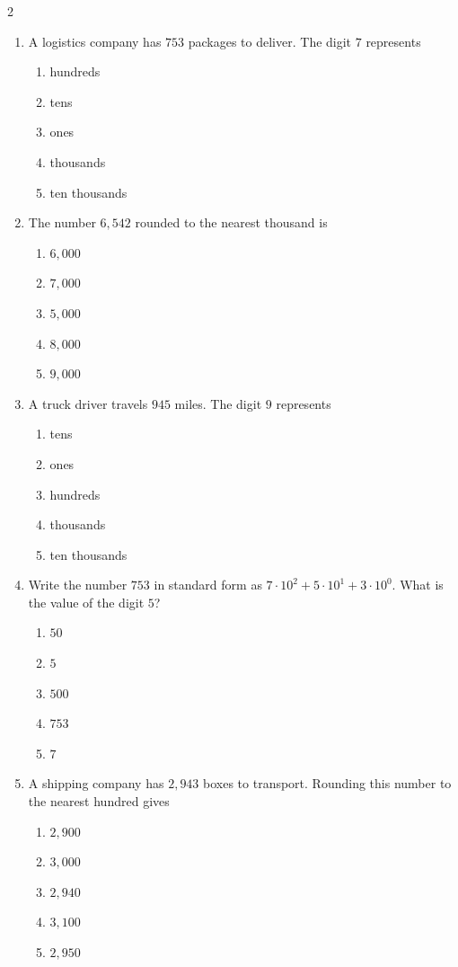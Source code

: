 \documentclass[10pt]{article}
\begin{document}
\begin{multicols}{2}
\begin{enumerate}[label=\textbf{Q\arabic*.}, leftmargin=*, itemsep=6pt, parsep=0pt]
  \item \small A logistics company has $753$ packages to deliver. The digit $7$ represents
  \begin{enumerate}[label=(\Alph*), leftmargin=0.6cm, nosep, itemsep=2pt]
    \item hundreds
    \item tens
    \item ones
    \item thousands
    \item ten thousands
  \end{enumerate}

  \item \small The number $6,542$ rounded to the nearest thousand is
  \begin{enumerate}[label=(\Alph*), leftmargin=0.6cm, nosep, itemsep=2pt]
    \item $6,000$
    \item $7,000$
    \item $5,000$
    \item $8,000$
    \item $9,000$
  \end{enumerate}

  \item \small A truck driver travels $945$ miles. The digit $9$ represents
  \begin{enumerate}[label=(\Alph*), leftmargin=0.6cm, nosep, itemsep=2pt]
    \item tens
    \item ones
    \item hundreds
    \item thousands
    \item ten thousands
  \end{enumerate}

  \item \small Write the number $753$ in standard form as $7 \cdot 10^2 + 5 \cdot 10^1 + 3 \cdot 10^0$. What is the value of the digit $5$?
  \begin{enumerate}[label=(\Alph*), leftmargin=0.6cm, nosep, itemsep=2pt]
    \item $50$
    \item $5$
    \item $500$
    \item $753$
    \item $7$
  \end{enumerate}

  \item \small A shipping company has $2,943$ boxes to transport. Rounding this number to the nearest hundred gives
  \begin{enumerate}[label=(\Alph*), leftmargin=0.6cm, nosep, itemsep=2pt]
    \item $2,900$
    \item $3,000$
    \item $2,940$
    \item $3,100$
    \item $2,950$
  \end{enumerate}


\end{enumerate}
\end{multicols}
\end{document}

